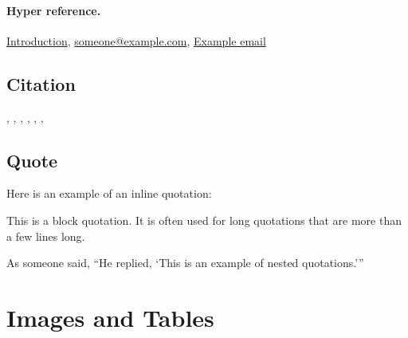 \documentclass{article}
\begin{document}
\paragraph{Hyper reference.}
\hyperref[sec:refer-cite]{Introduction},
\href{mailto:someone@example.com}{someone@example.com},
\href{https://www.example.com}{Example email}

\subsection{Citation}
\cite{VaswaniSPUJGKP17},
\citep{VaswaniSPUJGKP17},
\citet{VaswaniSPUJGKP17},
\citealt{VaswaniSPUJGKP17}, \citealp{VaswaniSPUJGKP17},
\citealt*{VaswaniSPUJGKP17},
\citeauthor{VaswaniSPUJGKP17}


\subsection{Quote}
Here is an example of an inline quotation: 

\begin{displayquote}
This is a block quotation. It is often used for long quotations that are more than a few lines long.
\end{displayquote}

As someone said, \enquote{He replied, \enquote{This is an example of nested quotations.}}









\clearpage
\section{Images and Tables}
\end{document}
